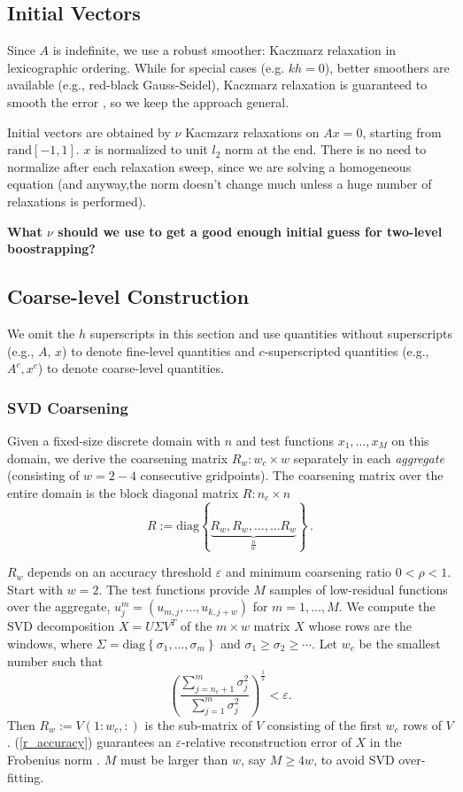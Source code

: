 \documentclass{article}
\begin{document}
\subsection{Initial Vectors}
Since $A$ is indefinite, we use a robust smoother: Kaczmarz relaxation in lexicographic ordering. While for special cases (e.g. $k h = 0$), better smoothers are available (e.g., red-black Gauss-Seidel), Kaczmarz relaxation is guaranteed to smooth the error \cite{amg_theory}, so we keep the approach general.

Initial vectors are obtained by $\nu$ Kacmzarz relaxations on $A x = 0$, starting from $\text{rand}[-1, 1]$. $x$ is normalized to unit $l_2$ norm at the end. There is no need to normalize after each relaxation sweep, since we are solving a homogeneous equation (and anyway,the norm doesn't change much unless a huge number of relaxations is performed). 

{\bf What $\nu$ should we use to get a good enough initial guess for two-level boostrapping?}

\subsection{Coarse-level Construction}
We omit the $h$ superscripts in this section and use quantities without superscripts (e.g., $A$, $x$) to denote fine-level quantities and $c$-superscripted quantities (e.g., $A^c, x^c$) to denote coarse-level quantities.

\subsubsection{SVD Coarsening}
\label{svd_coarsening}
Given a fixed-size discrete domain with $n$ and test functions $x_1,\dots,x_M$ on this domain, we derive the coarsening matrix $R_w: w_c \times w$ separately in each \emph{aggregate} (consisting of $w = 2-4$ consecutive gridpoints). The coarsening matrix over the entire domain is the block diagonal matrix $R: n_c \times n$
\begin{equation}
	R := \text{diag} \left\{ \underbrace{R_w, R_w, \dots, ... R_w }_{\frac{n}{w}}  \right\} \,.
\end{equation}

$R_w$ depends on an accuracy threshold $\varepsilon$ and minimum coarsening ratio $0 < \rho < 1$. Start with $w = 2$. The test functions provide $M$ samples of low-residual functions over the aggregate, $u^m_j= (u_{m,j},\dots,u_{k,j+w})$ for $m = 1,\dots,M$. We compute the SVD decomposition $X = U \Sigma V^T$ of the $m \times w$ matrix $X$ whose rows are the windows, where $\Sigma = \text{diag}\left\{\sigma_1, \dots, \sigma_m \right\}$ and $\sigma_1 \geq \sigma_2 \geq \cdots$. Let $w_c$ be the smallest number such that
\begin{equation}
	\left(\frac{\sum_{j=n_c+1}^m \sigma_j^2}{\sum_{j=1}^m \sigma_j^2 } \right)^{\frac12} < \varepsilon.
	\label{r_accuracy}
\end{equation}
Then $R_w := V(1:w_c,:)$ is the sub-matrix of $V$ consisting of the first $w_c$ rows of $V$. (\ref{r_accuracy}) guarantees an $\varepsilon$-relative reconstruction error of $X$ in the Frobenius norm \cite{svd}. $M$ must be larger than $w$, say $M \geq 4 w$, to avoid SVD over-fitting.
\end{document}
